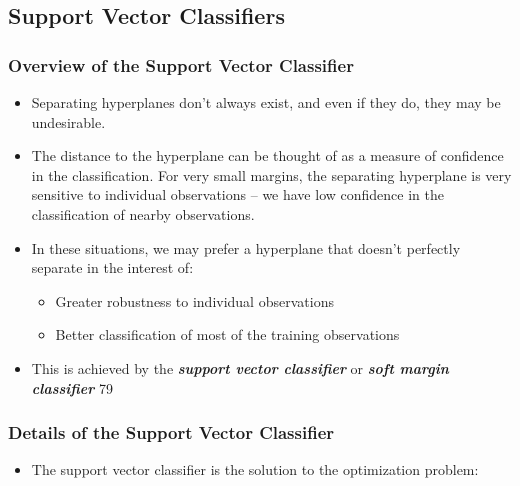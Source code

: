 \documentclass[11pt]{article}
\providecommand{\tightlist}{%
      \setlength{\itemsep}{0pt}\setlength{\parskip}{0pt}}
\begin{document}
    \hypertarget{support-vector-classifiers}{%
\subsection{Support Vector
Classifiers}\label{support-vector-classifiers}}

    \hypertarget{overview-of-the-support-vector-classifier}{%
\subsubsection{Overview of the Support Vector
Classifier}\label{overview-of-the-support-vector-classifier}}

    \begin{itemize}
\item
  Separating hyperplanes don't always exist, and even if they do, they
  may be undesirable.
\item
  The distance to the hyperplane can be thought of as a measure of
  confidence in the classification. For very small margins, the
  separating hyperplane is very sensitive to individual observations --
  we have low confidence in the classification of nearby observations.
\item
  In these situations, we may prefer a hyperplane that doesn't perfectly
  separate in the interest of:

  \begin{itemize}
  \tightlist
  \item
    Greater robustness to individual observations
  \item
    Better classification of most of the training observations
  \end{itemize}
\item
  This is achieved by the \textbf{\emph{support vector classifier}} or
  \textbf{\emph{soft margin classifier}} 79 
\end{itemize}

    \hypertarget{details-of-the-support-vector-classifier}{%
\subsubsection{Details of the Support Vector
Classifier}\label{details-of-the-support-vector-classifier}}

    \begin{itemize}
\tightlist
\item
  The support vector classifier is the solution to the optimization
  problem:
\end{itemize}
\end{document}
